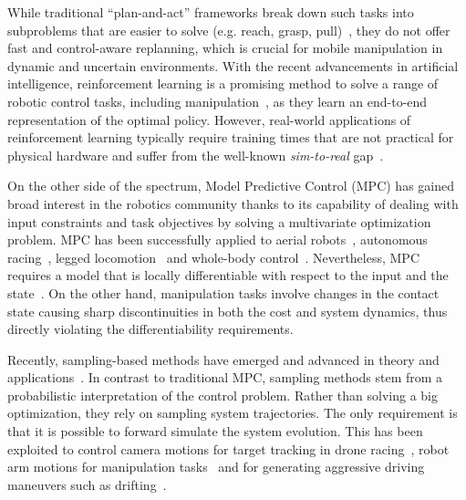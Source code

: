 While traditional ``plan-and-act'' frameworks break down such tasks into subproblems that are easier to solve (e.g. reach, grasp, pull)~\cite{Murali2020}, they do not offer fast and control-aware replanning, which is crucial for mobile manipulation in dynamic and uncertain environments. 
With the recent advancements in artificial intelligence, reinforcement learning is a promising method to solve a range of robotic control tasks, including manipulation~\cite{finn2016deep}, as they learn an end-to-end representation of the optimal policy. However, real-world applications of reinforcement learning typically require training times that are not practical for physical hardware and suffer from the well-known \emph{sim-to-real} gap~\cite{chebotar2019closing}. 

On the other side of the spectrum, Model Predictive Control (MPC) has gained broad interest in the robotics community thanks to its capability of dealing with input constraints and task objectives by solving a multivariate optimization problem. 
MPC has been successfully applied to aerial robots~\cite{brunner2020trajectory}, autonomous racing~\cite{liniger2015optimization}, legged locomotion~\cite{grandia2019frequency} and whole-body control~\cite{minniti2019whole}. Nevertheless, MPC requires a model that is locally differentiable with respect to the input and the state~\cite{buchli2017optimal}. On the other hand, manipulation tasks involve changes in the contact state causing sharp discontinuities in both the cost and system dynamics, thus directly violating the differentiability requirements. 

Recently, sampling-based methods have emerged and advanced in theory and applications~\cite{lee_aggressive_2020,abraham_model-based_2020,rajamaki_augmenting_2017}. 
In contrast to traditional MPC, sampling methods stem from a probabilistic interpretation of the control problem. 
Rather than solving a big optimization, they rely on sampling system trajectories. The only requirement is that it is possible to forward simulate the system evolution. This has been exploited to control camera motions for target tracking in drone racing~\cite{lee_aggressive_2020}, robot arm motions for manipulation tasks~\cite{abraham_model-based_2020} and for generating aggressive driving maneuvers such as drifting~\cite{williams_information_2017}. 

